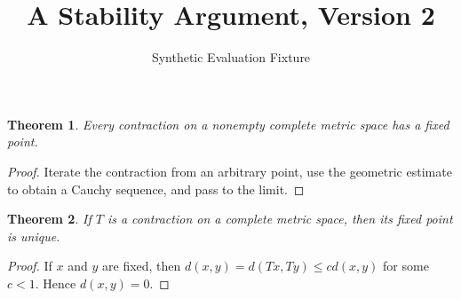 \documentclass{article}
\title{A Stability Argument, Version 2}
\author{Synthetic Evaluation Fixture}
\newtheorem{theorem}{Theorem}
\begin{document}
\maketitle

\begin{theorem}\label{th:existence}
Every contraction on a nonempty complete metric space has a fixed point.
\end{theorem}

\begin{proof}
Iterate the contraction from an arbitrary point, use the geometric estimate to obtain a Cauchy sequence, and pass to the limit.
\end{proof}

\begin{theorem}\label{th:stability}
If $T$ is a contraction on a complete metric space, then its fixed point is unique.
\end{theorem}

\begin{proof}
If $x$ and $y$ are fixed, then $d(x,y)=d(Tx,Ty)\leq c d(x,y)$ for some $c<1$. Hence $d(x,y)=0$.
\end{proof}
\end{document}
